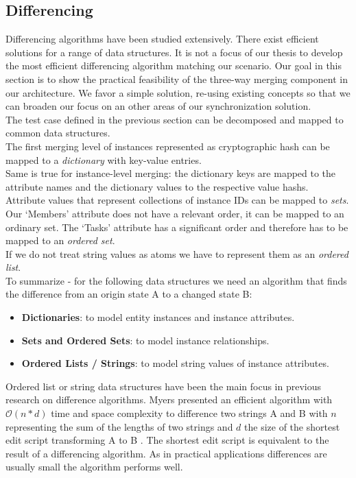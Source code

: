 \subsection{Differencing}
\label{sec:main.histo.merging.diff}
Differencing algorithms have been studied extensively.
There exist efficient solutions for a range of data structures.
It is not a focus of our thesis to develop the most efficient differencing algorithm matching our scenario.
Our goal in this section is to show the practical feasibility of the three-way merging component in our architecture.
We favor a simple solution, re-using existing concepts so that we can broaden our focus on an other areas of our synchronization solution.\\
The test case defined in the previous section can be decomposed and mapped to common data structures.\\
The first merging level of instances represented as cryptographic hash can be mapped to a \emph{dictionary} with key-value entries.\\
Same is true for instance-level merging: the dictionary keys are mapped to the attribute names and the dictionary values to the respective value hashs.\\
Attribute values that represent collections of instance IDs can be mapped to \emph{sets}.
Our `Members' attribute does not have a relevant order, it can be mapped to an ordinary set.
The `Tasks' attribute has a significant order and therefore has to be mapped to an \emph{ordered set}.\\
If we do not treat string values as atoms we have to represent them as an \emph{ordered list}.\\

To summarize - for the following data structures we need an algorithm that finds the difference from an origin state A to a changed state B:

\begin{itemize}
\item \textbf{Dictionaries}: to model entity instances and instance attributes.
\item \textbf{Sets and Ordered Sets}: to model instance relationships.
\item \textbf{Ordered Lists / Strings}: to model string values of instance attributes.
\end{itemize}

Ordered list or string data structures have been the main focus in previous research on difference algorithms.
Myers presented an efficient algorithm with $\mathcal O(n*d) $ time and space complexity to difference two strings A and B with
$ n $ representing the sum of the lengths of two strings and $ d $ the size of the shortest edit script transforming A to B \cite{Myers:1986wi}.
The shortest edit script is equivalent to the result of a differencing algorithm.
As in practical applications differences are usually small the algorithm performs well.\\

